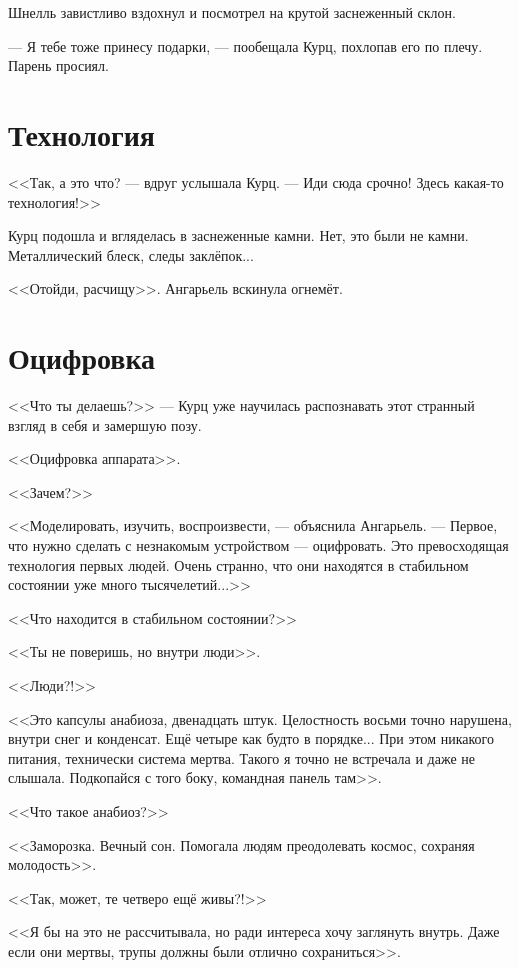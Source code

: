 Шнелль завистливо вздохнул и посмотрел на крутой заснеженный склон.

--- Я тебе тоже принесу подарки, --- пообещала Курц, похлопав его по плечу.
Парень просиял.

\section{Технология}

<<Так, а это что? --- вдруг услышала Курц.
--- Иди сюда срочно!
Здесь какая-то технология!>>

Курц подошла и вгляделась в заснеженные камни.
Нет, это были не камни.
Металлический блеск, следы заклёпок...

<<Отойди, расчищу>>.
Ангарьель вскинула огнемёт.

\section{Оцифровка}

<<Что ты делаешь?>> --- Курц уже научилась распознавать этот странный взгляд в себя и замершую позу.

<<Оцифровка аппарата>>.

<<Зачем?>>

<<Моделировать, изучить, воспроизвести, --- объяснила Ангарьель.
--- Первое, что нужно сделать с незнакомым устройством --- оцифровать.
Это превосходящая технология первых людей.
Очень странно, что они находятся в стабильном состоянии уже много тысячелетий...>>

<<Что находится в стабильном состоянии?>>

<<Ты не поверишь, но внутри люди>>.

<<Люди?!>>

<<Это капсулы анабиоза, двенадцать штук.
Целостность восьми точно нарушена, внутри снег и конденсат.
Ещё четыре как будто в порядке...
При этом никакого питания, технически система мертва.
Такого я точно не встречала и даже не слышала.
Подкопайся с того боку, командная панель там>>.

<<Что такое анабиоз?>>

<<Заморозка.
Вечный сон.
Помогала людям преодолевать космос, сохраняя молодость>>.

<<Так, может, те четверо ещё живы?!>>

<<Я бы на это не рассчитывала, но ради интереса хочу заглянуть внутрь.
Даже если они мертвы, трупы должны были отлично сохраниться>>.

